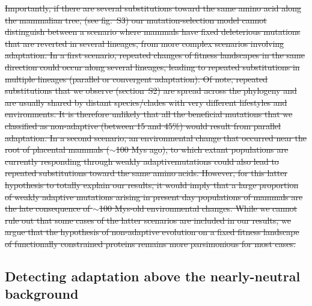 \documentclass{article}
\providecommand{\DIFdeltex}[1]{{\protect\color{red}\sout{#1}}}                      %
\providecommand{\DIFdelbegin}{} %
\providecommand{\DIFdelend}{} %
\providecommand{\DIFdel}[1]{\texorpdfstring{\DIFdeltex{#1}}{}} %
\newcommand{\DIFscaledelfig}{0.5}
\newlength{\DIFdelgraphicswidth} %
\newlength{\DIFdelgraphicsheight} %
\newcommand{\DIFdelincludegraphics}[2][]{%
\sbox{\DIFdelgraphicsbox}{\DIFOincludegraphics[#1]{#2}}%
\settoboxwidth{\DIFdelgraphicswidth}{\DIFdelgraphicsbox} %
\settoboxtotalheight{\DIFdelgraphicsheight}{\DIFdelgraphicsbox} %
\scalebox{\DIFscaledelfig}{%
\parbox[b]{\DIFdelgraphicswidth}{\usebox{\DIFdelgraphicsbox}\\[-\baselineskip] \rule{\DIFdelgraphicswidth}{0em}}\llap{\resizebox{\DIFdelgraphicswidth}{\DIFdelgraphicsheight}{%
\setlength{\unitlength}{\DIFdelgraphicswidth}%
\begin{picture}(1,1)%
\thicklines\linethickness{2pt} %
{\color[rgb]{1,0,0}\put(0,0){\framebox(1,1){}}}%
{\color[rgb]{1,0,0}\put(0,0){\line( 1,1){1}}}%
{\color[rgb]{1,0,0}\put(0,1){\line(1,-1){1}}}%
\end{picture}%
}\hspace*{3pt}}} %
} %
\DeclareRobustCommand{\DIFdelbegin}{\DIFOdelbegin \let\includegraphics\DIFdelincludegraphics} %
\DeclareRobustCommand{\DIFdelend}{\DIFOaddend \let\includegraphics\DIFOincludegraphics} %
\begin{document}
    \DIFdelbegin \DIFdel{Importantly, if there are several substitutions toward the same amino acid along the mammalian tree, (see fig.~S3) our mutation-selection model cannot distinguish between a scenario where mammals have fixed deleterious mutations that are reverted in several lineages, from more complex scenarios involving adaptation.
    In a first scenario, repeated changes of fitness landscapes in the same direction could occur along several lineages, leading to repeated substitutions in multiple lineages (parallel or convergent adaptation).
    Of note, repeated substitutions that we observe (section~S2) are spread across the phylogeny and are usually shared by distant species/clades with very different lifestyles and environments.
    It is therefore unlikely that all the beneficial mutations that we classified as non-adaptive (between 15 and 45\%) would result from parallel adaptation.
    In a second scenario, an environmental change that occurred near the root of placental mammals ($\sim$100 Mys ago), to which extant populations are currently responding through weakly adaptivemutations could also lead to repeated substitutions toward the same amino acids.
    However, for this latter hypothesis to totally explain our results, it would imply that a large proportion of weakly adaptive mutations arising in present day populations of mammals are the late consequence of $\sim$100 Mys-old environmental changes.
    While we cannot rule out that some cases of the latter scenarios are included in our results, we argue that the hypothesis of non-adaptive evolution on a fixed fitness landscape of functionally constrained proteins remains more parsimonious for most cases.
}%

\DIFdelend \subsection*{Detecting adaptation above the nearly-neutral background}
\end{document}
